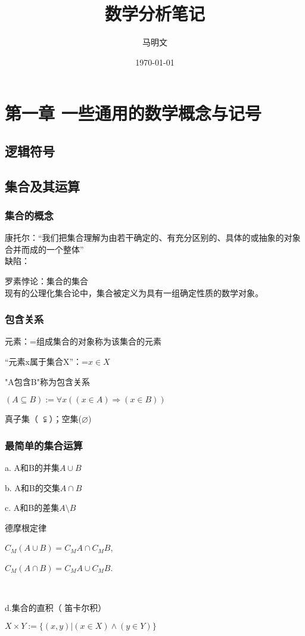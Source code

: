 \documentclass{article}
\title{数学分析笔记}
\author{马明文}
\date{\today}
\begin{document}
	\maketitle
	\section{第一章 \quad 一些通用的数学概念与记号}
	\subsection{逻辑符号}
	\subsection{集合及其运算}
	\subsubsection{集合的概念}
	康托尔：“我们把集合理解为由若干确定的、有充分区别的、具体的或抽象的对象合并而成的一个整体”
	~\\
	
	缺陷：
	
	罗素悖论：集合的集合
	 ~\\
	 
	现有的公理化集合论中，集合被定义为具有一组确定性质的数学对象。
	
	\subsubsection{包含关系}
	元素：=组成集合的对象称为该集合的元素
	
	“元素x属于集合X”：=$x \in X$
	
	"A包含B"称为包含关系
	
	$(A\subseteq B):=\forall x((x\in A)\Rightarrow (x\in B))$
	
	真子集（ $\subsetneqq$）；空集($\varnothing$)
	
	\subsubsection{最简单的集合运算}
	a. A和B的并集\quad$ A\cup B$
	~\\
	\par b. A和B的交集\quad$A\cap B$
	~\\
	\par c. A和B的差集\quad $A\setminus B$
	~\\
	\par 德摩根定律\par
	$C_M (A \cup B)=C_M A\cap C_M B$,\par
	$C_M (A \cap B)=C_M A \cup C_M B$.\par
	~\\
	\par d.集合的直积（  笛卡尔积）\par
	$X\times Y:=\{(x,y)\rvert (x\in X)\land (y\in Y)\}$
	
\end{document}
